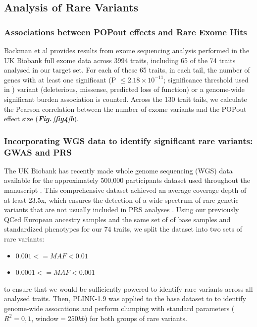 \documentclass[12pt]{zHenriquesLab-StyleBioRxiv}
\newcommand\dref[2]{\normalsize{\textbf{\textit{Fig.\,\ref{#1}#2}}}\normalsize{}}
\begin{document}
{{\clearpage \newpage

{\color{blue} 
\subsection*{Analysis of Rare Variants} \label{sec:methods:rvs} 

\subsubsection*{Associations between POPout effects and Rare Exome Hits}

Backman et al \cite{Backman2021} provides results from exome sequencing analysis 
performed in the UK Biobank full exome data across 3994 traits, including 65 of 
the 74 traits analysed in our target set. For each of these 65 traits, in each tail, 
the number of genes with at least one significant (P $\le 2.18\times 10^{-11}$; significance 
threshold used in \cite{Backman2021}) variant (deleterious, missense, predicted loss of function) or a 
genome-wide significant burden association is counted. Across the 130 trait tails, we 
calculate the Pearson correlation between the number of exome variants and the POPout 
effect size (\dref{fig4}{b}). 


\subsubsection*{Incorporating WGS data to identify significant rare variants: GWAS and PRS}

The UK Biobank has recently made whole genome sequencing (WGS) data available for the
approximately 500,000 participants dataset used throughout the manuscript \cite{ukb, ukb3}.  This
comprehensive dataset achieved an average coverage depth of at least 23.5x, which ensures
the detection of a wide spectrum of rare genetic variants that are not usually included in
PRS analyses \cite{ukb2}.  Using our previously QCed European ancestry samples and the
same set of of base samples and standardized phenotypes for our 74 traits, we split the
dataset into two sets of rare variants:

\begin{itemize}
    \item[\textbf{A:}] $0.001 <= MAF < 0.01$
    \item[\textbf{B:}] $0.0001 <= MAF < 0.001$
\end{itemize}

to ensure that we would be sufficiently powered to identify rare variants across
all analysed traits.  Then, PLINK-1.9 \cite{plink, bt_10} was applied to the base dataset
to to identify genome-wide assocations and perform clumping with standard
parameters ($R^2=0,1$, window$=250kb$) \cite{Choi2020} for both groups of rare variants.

}}}
\end{document}
